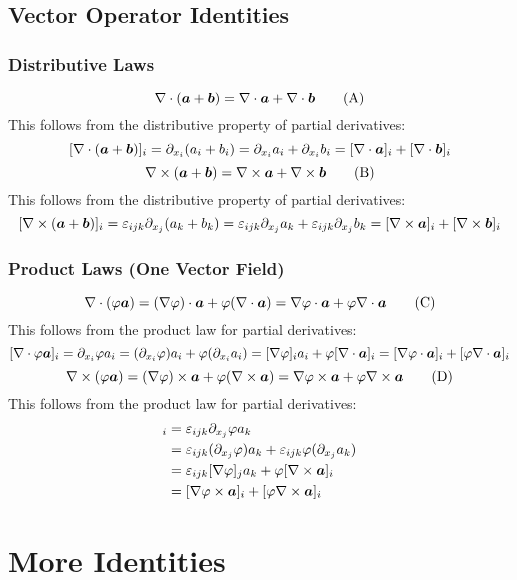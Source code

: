 \documentclass{article}
\newcommand{\pdvx}[1]{\partial_{x_{#1}}}
\begin{document}
    \subsection{Vector Operator Identities}
    \subsubsection{Distributive Laws}
    \[\nabla\cdot(\bm{a} + \bm{b}) = \nabla\cdot\bm{a} + \nabla\cdot\bm{b}\tag{A}\]\label{eqn:A}
    This follows from the distributive property of partial derivatives:
    \[[\div(\vv a + \vv b)]_i = \pdvx i(a_i + b_i) = \pdvx i a_i + \pdvx i b_i = [\div\vv a]_i + [\div\vv b]_i\]
    \[\nabla\times(\bm{a} + \bm{b}) = \nabla\times\bm{a} + \nabla\times\bm{b}\tag{B}\]
    This follows from the distributive property of partial derivatives:
    \[[\curl(\vv a + \vv b)]_i = \varepsilon_{ijk}\pdvx j(a_k + b_k) = \varepsilon_{ijk}\pdvx j a_k + \varepsilon_{ijk}\pdvx j b_k = [\curl\vv a]_i + [\curl\vv b]_i\]
    \subsubsection{Product Laws (One Vector Field)}
    \[\nabla\cdot(\varphi\bm{a}) = (\nabla\varphi)\cdot\bm{a} + \varphi(\nabla\cdot\bm{a}) = \nabla\varphi\cdot\bm{a} + \varphi\nabla\cdot\bm{a}\tag{C}\]
    This follows from the product law for partial derivatives:
    \[[\div\varphi\vv a]_i = \pdvx i\varphi a_i = (\pdvx i\varphi)a_i + \varphi(\pdvx i a_i) = [\grad\varphi]_ia_i + \varphi[\div\vv a]_i = [\grad\varphi\cdot\vv a]_i + [\varphi\div\vv a]_i\]
    \[\nabla\times(\varphi\bm{a}) = (\nabla\varphi)\times\bm{a} + \varphi(\nabla\times\bm{a}) = \nabla\varphi\times\bm{a} + \varphi\nabla\times\bm{a}\tag{D}\]
    This follows from the product law for partial derivatives:
    \begin{align*}
        [\curl\varphi\vv a]_i &= \varepsilon_{ijk}\pdvx j\varphi a_k\\
        &= \varepsilon_{ijk}(\pdvx j\varphi)a_k + \varepsilon_{ijk}\varphi(\pdvx j a_k)\\
        &= \varepsilon_{ijk}[\grad\varphi]_j a_k + \varphi[\curl\vv a]_i\\
        &= [\grad\varphi\times\vv a]_i + [\varphi\curl\vv a]_i
    \end{align*}
    
    \section{More Identities}
\end{document}
